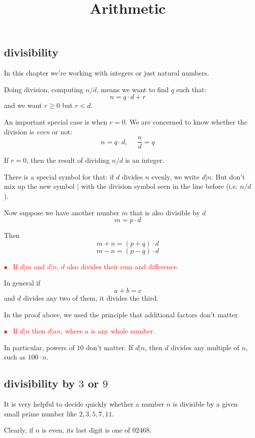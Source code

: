 \documentclass[11pt, oneside]{article}
\title{Arithmetic}
\date{}
\begin{document}
\maketitle
\Large

\subsection*{divisibility}

In this chapter we're working with integers or just natural numbers.

Doing division, computing $n/d$, means we want to find $q$ such that:
\[ n = q \cdot d + r \]
and we want $r \ge 0$ but $r < d$.

An important special case is when $r = 0$.  We are concerned to know whether the division is \emph{even} or not:
\[ n = q \cdot d, \ \ \ \ \ \ \frac{n}{d} = q \]

If $r = 0$, then the result of dividing $n/d$ is an integer.

There is a special symbol for that:  if $d$ divides $n$ evenly, we write $d|n$.  But don't mix up the new symbol $|$ with the division symbol seen in the line before (i.e. $n/d$).

Now suppose we have another number $m$ that is also divisible by $d$
\[ m = p \cdot d \]

Then 
\[ m + n = (p + q) \cdot d \]
\[ m - n = (p - q) \cdot d \]

\textcolor{red}{$\bullet$ \ If $d|m$ and $d|n$, $d$ also divides their sum and difference.} 

In general if
\[ a + b = c \]
and $d$ divides any two of them, it divides the third.

In the proof above, we used the principle that additional factors don't matter.

\textcolor{red}{$\bullet$ \ If $d|n$ then $d|an$, where $a$ is any whole number.} 

In particular, powers of $10$ don't matter.  If $d|n$, then $d$ divides any multiple of $n$, such as $100 \cdot n$.

\subsection*{divisibility by $3$ or $9$}

It is very helpful to decide quickly whether a number $n$ is divisible by a given small prime number like $2, 3, 5, 7, 11$.

Clearly, if $n$ is even, its last digit is one of $02468$.
\end{document}
